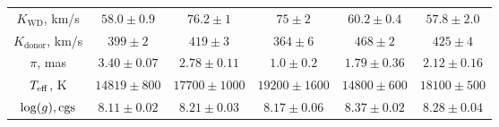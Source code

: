 \begin{landscape}
\begin{table}
\begin{tabular}{cccccc}
            $K_\mathrm{WD}$, km/s      & $58.0\pm0.9$            & $76.2\pm1$               & $75\pm2$                  & $60.2\pm0.4$              & $57.8\pm2.0$ \\
            $K_\mathrm{donor}$, km/s   & $399\pm2$               & $419\pm3$                & $364\pm6$                 & $468\pm2$                 & $425\pm4$ \\
            \hline
            $\pi$, mas                 & $3.40\pm0.07$           & $2.78\pm0.11$            & $1.0\pm0.2$               & $1.79\pm0.36$             & $2.12\pm0.16$ \\
            $T_{\rm eff}$, K           & $14819\pm800$           & $17700\pm1000$           & $19200\pm1600$            & $14800\pm600$             & $18100\pm500$ \\
            $\log(g), {\rm cgs}$       & $8.11\pm0.02$           & $8.21\pm0.03$            & $8.17\pm0.06$             & $8.37\pm0.02$             & $8.28\pm0.04$ \\
            \hline
            \hline
        \end{tabular}
    \end{table}


\end{landscape}
